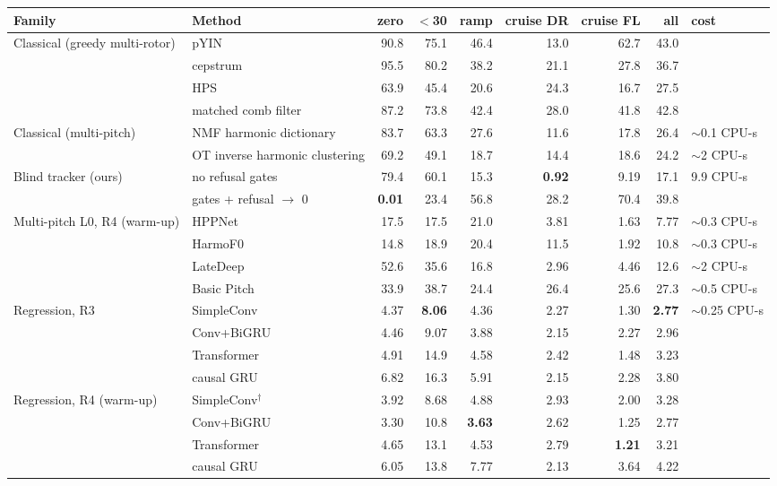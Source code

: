 \begin{tabular}{@{}llrrrrrrl@{}}
\toprule
Family & Method & zero & $<$30 & ramp & cruise DR & cruise FL & all & cost \\
\midrule
\multirow{4}{*}{Classical (greedy multi-rotor)} & pYIN & 90.8 & 75.1 & 46.4 & 13.0 & 62.7 & 43.0 &  \\
 & cepstrum & 95.5 & 80.2 & 38.2 & 21.1 & 27.8 & 36.7 &  \\
 & HPS & 63.9 & 45.4 & 20.6 & 24.3 & 16.7 & 27.5 &  \\
 & matched comb filter & 87.2 & 73.8 & 42.4 & 28.0 & 41.8 & 42.8 &  \\
\midrule
\multirow{2}{*}{Classical (multi-pitch)} & NMF harmonic dictionary & 83.7 & 63.3 & 27.6 & 11.6 & 17.8 & 26.4 & $\sim$0.1 CPU-s \\
 & OT inverse harmonic clustering & 69.2 & 49.1 & 18.7 & 14.4 & 18.6 & 24.2 & $\sim$2 CPU-s \\
\midrule
\multirow{2}{*}{Blind tracker (ours)} & no refusal gates & 79.4 & 60.1 & 15.3 & \textbf{0.92} & 9.19 & 17.1 & \multirow{2}{*}{9.9 CPU-s} \\
 & gates + refusal $\to$ 0 & \textbf{0.01} & 23.4 & 56.8 & 28.2 & 70.4 & 39.8 &  \\
\midrule
\multirow{4}{*}{Multi-pitch L0, R4 (warm-up)} & HPPNet & 17.5 & 17.5 & 21.0 & 3.81 & 1.63 & 7.77 & $\sim$0.3 CPU-s \\
 & HarmoF0 & 14.8 & 18.9 & 20.4 & 11.5 & 1.92 & 10.8 & $\sim$0.3 CPU-s \\
 & LateDeep & 52.6 & 35.6 & 16.8 & 2.96 & 4.46 & 12.6 & $\sim$2 CPU-s \\
 & Basic Pitch & 33.9 & 38.7 & 24.4 & 26.4 & 25.6 & 27.3 & $\sim$0.5 CPU-s \\
\midrule
\multirow{4}{*}{Regression, R3} & SimpleConv & 4.37 & \textbf{8.06} & 4.36 & 2.27 & 1.30 & \textbf{2.77} & \multirow{4}{*}{$\sim$0.25 CPU-s} \\
 & Conv+BiGRU & 4.46 & 9.07 & 3.88 & 2.15 & 2.27 & 2.96 &  \\
 & Transformer & 4.91 & 14.9 & 4.58 & 2.42 & 1.48 & 3.23 &  \\
 & causal GRU & 6.82 & 16.3 & 5.91 & 2.15 & 2.28 & 3.80 &  \\
\midrule
\multirow{4}{*}{Regression, R4 (warm-up)} & SimpleConv$^\dagger$ & 3.92 & 8.68 & 4.88 & 2.93 & 2.00 & 3.28 &  \\
 & Conv+BiGRU & 3.30 & 10.8 & \textbf{3.63} & 2.62 & 1.25 & 2.77 &  \\
 & Transformer & 4.65 & 13.1 & 4.53 & 2.79 & \textbf{1.21} & 3.21 &  \\
 & causal GRU & 6.05 & 13.8 & 7.77 & 2.13 & 3.64 & 4.22 &  \\
\bottomrule
\end{tabular}
